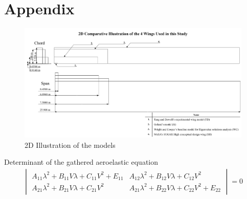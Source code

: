 \documentclass[11pt]{article}
\begin{document}
\section*{Appendix}
\appendix
{}
\label{app:2D-para}
\begin{figure}[H]
    \centering
    \includegraphics[width =\textwidth]{figures/para.png}
    \caption{2D Illustration of the models}
    \label{fig:2D-wings}
\end{figure}
\iffalse
{}
Determinant of the gathered aeroelastic equation
\begin{equation}\label{eq:determinant}
    \begin{gathered}
    \begin{vmatrix} A_{11}\lambda^2+B_{11}V\lambda+C_{11}V^2+E_{11} & A_{12}\lambda^2+B_{12}V\lambda+C_{12}V^2\\
    A_{21}\lambda^2+B_{21}V\lambda+C_{21}V^2&A_{21}\lambda^2+B_{22}V\lambda+C_{22}V^2+E_{22}\end{vmatrix}=0
    \end{gathered}
\end{equation}
\end{document}
